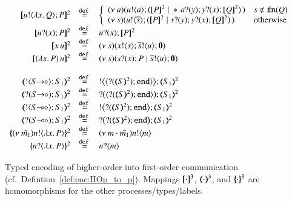 \begin{figure}[t]
	\[
	\begin{array}{rcl}
		\pmap{\bout{u}{\abs{x}{Q}} P}{2} & \defeq &  \left\{
		\begin{array}{ll}
			\newsp{a}{\bout{u}{a} (\pmap{P}{2} \Par \repl{} \binp{a}{y} \binp{y}{x} \pmap{Q}{2})\,} & s \notin \fn{Q} \\
			\newsp{s}{\bout{u}{\dual{s}} (\pmap{P}{2} \Par \binp{s}{y} \binp{y}{x} \pmap{Q}{2})\,} & \textrm{otherwise} %
		\end{array}
		\right.
		\\
		\pmap{\binp{u}{x} P}{2} &\defeq&  \binp{u}{x} \pmap{P}{2}
		\\
		\pmap{\appl{x}{u}}{2} & \defeq & \newsp{s}{\bout{x}{s} \bout{\dual{s}}{u} \inact}
		\\
		\pmap{\appl{(\abs{x}{P})}{u}}{2} & \defeq & \newsp{s}{\binp{s}{x} P \Par \bout{\dual{s}}{u} \inact}
		\\
		\\
		\tmap{\btout{\shot{S}}S_1}{2} & \defeq & \bbtout{\chtype{\btinp{\tmap{S}{2}}\tinact}}\tmap{S_1}{2} \\
		\tmap{\btinp{\shot{S}}S_1}{2} & \defeq & \bbtinp{\chtype{\btinp{\tmap{S}{2}}\tinact}}\tmap{S_1}{2} \\

		\tmap{\btout{\lhot{S}}S_1}{2} & \defeq & \bbtout{\btinp{\tmap{S}{2}}\tinact}\tmap{S_1}{2} \\
		\tmap{\btinp{\lhot{S}}S_1}{2} & \defeq & \bbtinp{\btinp{\tmap{S}{2}}\tinact}\tmap{S_1}{2} \\
		\mapa{\news{\tilde{m_1}}\bactout{n}{\abs{ x}{P}} }^{2} &  \defeq & \news{m \cdot \tilde{m_1}} \bactout{n}{m} \\
		\mapa{\bactinp{n}{\abs{ x}{P}} }^{2} &  \defeq & \bactinp{n}{m}
	\end{array}
	\]
	\caption{
		Typed encoding of higher-order  into first-order communication (cf.~Defintion~\ref{def:enc:HOp_to_p}).
		\label{fig:enc:HOp_to_p}
		Mappings 
		$[\!\![\cdot]\!\!]^3$,
		$(\!\!\langle\cdot\rangle\!\!)^3$, 
		and 
		$\{\!\!\{\cdot\}\!\!\}^3$
		are homomorphisms for the other processes/types/labels. 
	}
\end{figure}
